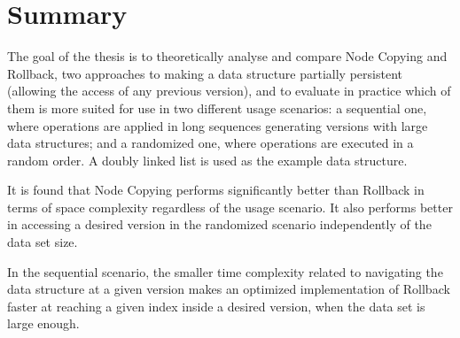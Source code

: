 \chapter{Summary}

The goal of the thesis is to theoretically analyse and compare Node Copying and
Rollback, two approaches to making a data structure partially persistent
(allowing the access of any previous version), and to evaluate in practice which
of them is more suited for use in two different usage scenarios: a sequential
one, where operations are applied in long sequences generating versions with
large data structures; and a randomized one, where operations are executed in a
random order. A doubly linked list is used as the example data structure.

It is found that Node Copying performs significantly better than Rollback in
terms of space complexity regardless of the usage scenario. It also performs
better in accessing a desired version in the randomized scenario independently
of the data set size.

In the sequential scenario, the smaller time complexity related to navigating
the data structure at a given version makes an optimized implementation of
Rollback faster at reaching a given index inside a desired version, when the
data set is large enough.
